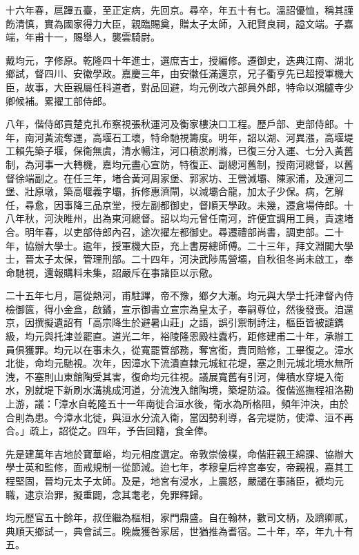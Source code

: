 \begin{pinyinscope}
十六年春，扈蹕五臺，至正定病，先回京。尋卒，年五十有七。溫詔優恤，稱其謹飭清慎，實為國家得力大臣，親臨賜奠，贈太子太師，入祀賢良祠，謚文端。子嘉端，年甫十一，賜舉人，襲雲騎尉。

戴均元，字修原。乾隆四十年進士，選庶吉士，授編修。遷御史，迭典江南、湖北鄉試，督四川、安徽學政。嘉慶三年，由安徽任滿還京，兄子衢亨先已超授軍機大臣，故事，大臣親屬任科道者，對品回避，均元例改六部員外郎，特命以鴻臚寺少卿候補。累擢工部侍郎。

八年，偕侍郎貢楚克扎布察視張秋運河及衡家樓決口工程。歷戶部、吏部侍郎。十年，南河黃流奪運，高堰石工壞，特命馳視籌度。明年，詔以湖、河異漲，高堰堤工賴先築子堰，保衛無虞，清水暢注，河口積淤刷滌，已復三分入運、七分入黃舊制，為河事一大轉機，嘉均元盡心宣防，特復正、副總河舊制，授南河總督，以舊督徐端副之。在任三年，堵合黃河周家堡、郭家坊、王營減壩、陳家浦，及運河二堡、壯原墩，築高堰義字壩，拆修惠濟閘，以減壩合龍，加太子少保。病，乞解任，尋愈，因事降三品京堂，授左副都御史，督順天學政。未幾，遷倉場侍郎。十八年秋，河決睢州，出為東河總督。詔以均元曾任南河，許便宜調用工員，責速堵合。明年春，以吏部侍郎內召，途次擢左都御史。尋遷禮部尚書，調吏部。二十年，協辦大學士。逾年，授軍機大臣，充上書房總師傅。二十三年，拜文淵閣大學士，晉太子太保，管理刑部。二十四年，河決武陟馬營壩，自秋徂冬尚未啟工，奉命馳視，還報購料未集，詔嚴斥在事諸臣以示儆。

二十五年七月，扈從熱河，甫駐蹕，帝不豫，鄉夕大漸。均元與大學士托津督內侍檢御篋，得小金盒，啟鐍，宣示御書立宣宗為皇太子，奉嗣尊位，然後發喪。洎還京，因撰擬遺詔有「高宗降生於避暑山莊」之語，誤引禦制詩注，樞臣皆被譴鐫級，均元與托津並罷直。道光二年，裕陵隆恩殿柱蠹朽，距修建甫二十年，承辦工員俱獲罪。均元以在事未久，從寬罷管部務，奪宮銜，責同賠修，工畢復之。漳水北徙，命均元馳視。次年，因漳水下流潰直隸元城紅花堤，塞之則元城北境水無所洩，不塞則山東館陶受其害，復命均元往視。議展寬舊有引河，俾積水穿堤入衛水，別就堤下新刷水溝挑成河道，分流洩入館陶境，築堤防溢。復偕巡撫程祖洛勘上游，議：「漳水自乾隆五十一年南徙合洹水後，衛水為所格阻，頻年沖決，由於合則為患。今漳水北徙，與洹水分流入衛，當因勢利導，各完堤防，使漳、洹不再合。」疏上，詔從之。四年，予告回籍，食全俸。

先是建萬年吉地於寶華峪，均元相度選定。帝敦崇儉樸，命偕莊親王綿課、協辦大學士英和監修，面戒規制一從節減。迨七年，孝穆皇后梓宮奉安，帝親視，嘉其工程堅固，晉均元太子太師。及是，地宮有浸水，上震怒，嚴譴在事諸臣，褫均元職，逮京治罪，擬重闢，念其耄老，免罪釋歸。

均元歷官五十餘年，叔侄繼為樞相，家門鼎盛。自在翰林，數司文柄，及躋卿貳，典順天鄉試一，典會試三。晚歲獲咎家居，世猶推為耆宿。二十年，卒，年九十有五。


\end{pinyinscope}
